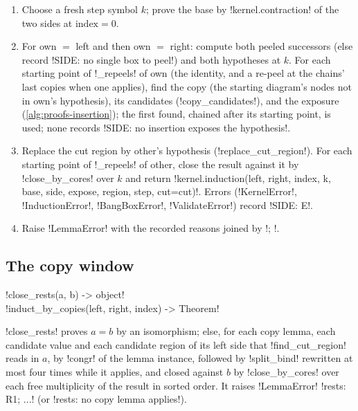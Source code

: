 \begin{algorithm}\label{alg:proofs-induct-insertion}
\leavevmode
\begin{enumerate}
\item Choose a fresh step symbol $k$; prove the base by \py!kernel.contraction! of the two sides at $\text{index}=0$.
\item For own $=$ left and then own $=$ right: compute both peeled successors (else record \code!SIDE: no single box to peel!) and both hypotheses at $k$. For each starting point of \py!_repeels! of own (the identity, and a re-peel at the chains' last copies when one applies), find the copy (the starting diagram's nodes not in own's hypothesis), its candidates (\py!copy_candidates!), and the exposure (\cref{alg:proofs-insertion}); the first found, chained after its starting point, is used; none records \code!SIDE: no insertion exposes the hypothesis!.
\item Replace the cut region by other's hypothesis (\py!replace_cut_region!). For each starting point of \py!_repeels! of other, close the result against it by \py!close_by_cores! over $k$ and return \py!kernel.induction(left, right, index, k, base, side, expose, region, step, cut=cut)!. Errors (\py!KernelError!, \py!InductionError!, \py!BangBoxError!, \py!ValidateError!) record \code!SIDE: E!.
\item Raise \py!LemmaError! with the recorded reasons joined by \code!; !.
\end{enumerate}
\end{algorithm}

\subsection{The copy window}

\begin{signature}
\py!close_rests(a, b) -> object!\\
\py!induct_by_copies(left, right, index) -> Theorem!
\end{signature}

\py!close_rests! proves $a=b$ by an isomorphism; else, for each copy lemma, each candidate value and each candidate region of its left side that \py!find_cut_region! reads in $a$, by \py!congr! of the lemma instance, followed by \code!split_bind! rewritten at most four times while it applies, and closed against $b$ by \py!close_by_cores! over each free multiplicity of the result in sorted order. It raises \py!LemmaError! \code!rests: R1; ...! (or \code!rests: no copy lemma applies!).

